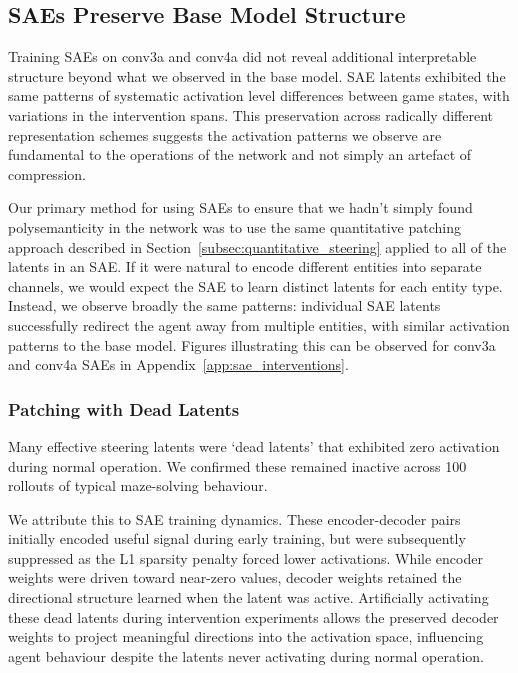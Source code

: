     \subsection{SAEs Preserve Base Model Structure}
    \label{subsec:sae_structure}
    Training SAEs on conv3a and conv4a did not reveal additional interpretable structure beyond what we observed in the base model. SAE latents exhibited the same patterns of systematic activation level differences between game states, with variations in the intervention spans. This preservation across radically different representation schemes suggests the activation patterns we observe are fundamental to the operations of the network and not simply an artefact of compression.

    Our primary method for using SAEs to ensure that we hadn't simply found polysemanticity in the network was to use the same quantitative patching approach described in Section~\ref{subsec:quantitative_steering} applied to all of the latents in an SAE. If it were natural to encode different entities into separate channels, we would expect the SAE to learn distinct latents for each entity type. Instead, we observe broadly the same patterns: individual SAE latents successfully redirect the agent away from multiple entities, with similar activation patterns to the base model. Figures illustrating this can be observed for conv3a and conv4a SAEs in Appendix~\ref{app:sae_interventions}.

\subsubsection{Patching with Dead Latents}
\label{subsec:dead_channel_steering}
Many effective steering latents were `dead latents' that exhibited zero activation during normal operation. We confirmed these remained inactive across 100 rollouts of typical maze-solving behaviour.

We attribute this to SAE training dynamics. These encoder-decoder pairs initially encoded useful signal during early training, but were subsequently suppressed as the L1 sparsity penalty forced lower activations. While encoder weights were driven toward near-zero values, decoder weights retained the directional structure learned when the latent was active. Artificially activating these dead latents during intervention experiments allows the preserved decoder weights to project meaningful directions into the activation space, influencing agent behaviour despite the latents never activating during normal operation.

